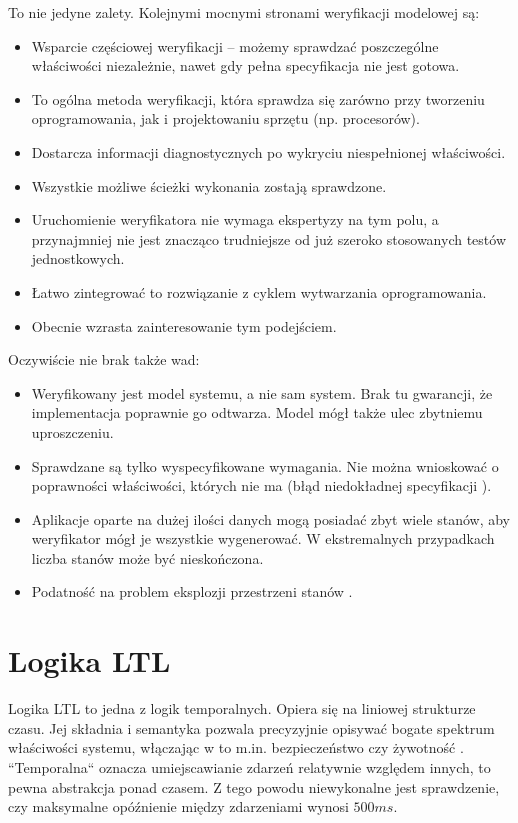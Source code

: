 \vspace{0.5cm}
\noindent
To nie jedyne zalety. Kolejnymi mocnymi stronami weryfikacji modelowej są:
\begin{itemize}
\item Wsparcie częściowej weryfikacji -- możemy sprawdzać poszczególne właściwości niezależnie, nawet gdy pełna specyfikacja nie jest gotowa.
\item To ogólna metoda weryfikacji, która sprawdza się zarówno przy tworzeniu oprogramowania, jak i projektowaniu sprzętu (np. procesorów).
\item Dostarcza informacji diagnostycznych po wykryciu niespełnionej właściwości.
\item Wszystkie możliwe ścieżki wykonania zostają sprawdzone.
\item Uruchomienie weryfikatora nie wymaga ekspertyzy na tym polu, a przynajmniej nie jest znacząco trudniejsze od już szeroko stosowanych testów jednostkowych.
\item Łatwo zintegrować to rozwiązanie z cyklem wytwarzania oprogramowania.
\item Obecnie wzrasta zainteresowanie tym podejściem.
\end{itemize}

\vspace{0.5cm}
\noindent
Oczywiście nie brak także wad:
\begin{itemize}
\item Weryfikowany jest model systemu, a nie sam system. Brak tu gwarancji, że implementacja poprawnie go odtwarza. Model mógł także ulec zbytniemu uproszczeniu.
\item Sprawdzane są tylko wyspecyfikowane wymagania. Nie można wnioskować o poprawności właściwości, których nie ma (błąd niedokładnej specyfikacji \cite{Lam05}).
\item Aplikacje oparte na dużej ilości danych mogą posiadać zbyt wiele stanów, aby weryfikator mógł je wszystkie wygenerować. W ekstremalnych przypadkach liczba stanów może być nieskończona.
\item Podatność na problem eksplozji przestrzeni stanów \cite{Cla11}.
\end{itemize}


\section{Logika LTL}

Logika LTL to jedna z logik temporalnych. Opiera się na liniowej strukturze czasu.
Jej składnia i semantyka pozwala precyzyjnie opisywać bogate spektrum właściwości systemu, włączając w to m.in. bezpieczeństwo czy żywotność \cite{Bel17}.
``Temporalna`` oznacza umiejscawianie zdarzeń relatywnie względem innych, to pewna abstrakcja ponad czasem.  Z tego powodu niewykonalne jest sprawdzenie, czy maksymalne opóźnienie między zdarzeniami wynosi $500ms$.

